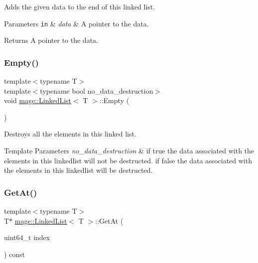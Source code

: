 Adds the given data to the end of this linked list.


\begin{DoxyParams}[1]{Parameters}
\mbox{\tt in}  & {\em data} & A pointer to the data. \\
\hline
\end{DoxyParams}
\begin{DoxyReturn}{Returns}
A pointer to the data. 
\end{DoxyReturn}
\hypertarget{classmage_1_1_linked_list_a6f57c11ad87c0f6d8f6ae8e785431c39}{}\label{classmage_1_1_linked_list_a6f57c11ad87c0f6d8f6ae8e785431c39} 
\subsubsection{\texorpdfstring{Empty()}{Empty()}}
{\footnotesize\ttfamily template$<$typename T$>$ \\
template$<$typename bool no\+\_\+data\+\_\+destruction$>$ \\
void \hyperlink{classmage_1_1_linked_list}{mage\+::\+Linked\+List}$<$ T $>$\+::Empty (\begin{DoxyParamCaption}{ }\end{DoxyParamCaption})}

Destroys all the elements in this linked list.


\begin{DoxyTemplParams}{Template Parameters}
{\em no\+\_\+data\+\_\+destruction} & if {\ttfamily true} the data associated with the elements in this linkedlist will not be destructed. if {\ttfamily false} the data associated with the elements in this linkedlist will be destructed. \\
\hline
\end{DoxyTemplParams}
\hypertarget{classmage_1_1_linked_list_a97922b200a12979e5c8692dd5f3f73d1}{}\label{classmage_1_1_linked_list_a97922b200a12979e5c8692dd5f3f73d1} 
\subsubsection{\texorpdfstring{Get\+At()}{GetAt()}}
{\footnotesize\ttfamily template$<$typename T$>$ \\
T$\ast$ \hyperlink{classmage_1_1_linked_list}{mage\+::\+Linked\+List}$<$ T $>$\+::Get\+At (\begin{DoxyParamCaption}\item[{uint64\+\_\+t}]{index }\end{DoxyParamCaption}) const}

